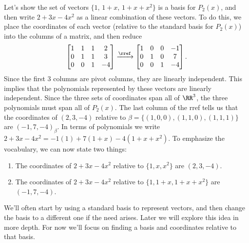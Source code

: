 \begin{example}
Let's show the set of vectors $\{1,\, 1+x,\, 1+x+x^2\}$ is a basis for $P_2(x)$, and then write $2+3x-4x^2$ as a linear combination of these vectors. 
To do this, we place the coordinates of each vector (relative to the standard basis for $P_2(x)$) into the columns of a matrix, and then reduce 
$$\begin{bmatrix}
 1 & 1 & 1 & 2 \\
 0 & 1 & 1 & 3 \\
 0 & 0 & 1 & -4
\end{bmatrix}
\xrightarrow{\rref}
\begin{bmatrix}
 1 & 0 & 0 & -1 \\
 0 & 1 & 0 & 7 \\
 0 & 0 & 1 & -4
\end{bmatrix}.$$ 
Since the first 3 columns are pivot columns, they are linearly independent. 
This implies that the polynomials represented by these vectors are linearly independent. Since the three sets of coordinates span all of $\RR^3$, the three polynomials must span all of $P_2(x)$.
The last column of the rref tells us that the coordinates of $(2,3,-4)$ relative to $\beta=\{(1,0,0),(1,1,0),(1,1,1)\}$ are $(-1,7,-4)_\beta$. In terms of polynomials we write $2+3x-4x^2 = -1(1)+7(1+x)-4(1+x+x^2)$. To emphasize the vocabulary, we can now state two things:
\begin{enumerate}
	\item The coordinates of $2+3x-4x^2$ relative to $\{1,x,x^2\}$ are $(2,3,-4)$.
	\item The coordinates of $2+3x-4x^2$ relative to $\{1,1+x,1+x+x^2\}$ are $(-1,7,-4)$.
\end{enumerate}
\end{example}

We'll often start by using a standard basis to represent vectors, and then change the basis to a different one if the need arises.  Later we will explore this idea in more depth.  For now we'll focus on finding a basis and coordinates relative to that basis.

